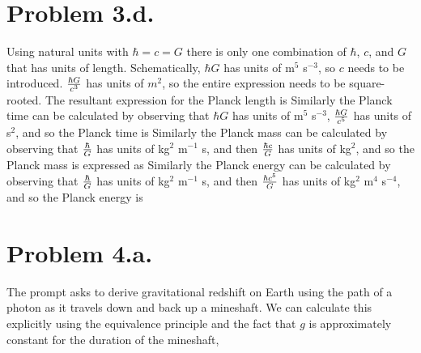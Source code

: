 \documentclass{article}
\begin{document}
\section*{Problem 3.d.}
Using natural units with $\hbar=c=G$ there is only one combination of $\hbar$, $c$, and $G$ that has units of length. Schematically,
$\hbar G$ has units of m$^5$ s$^{-3}$, so $c$ needs to be introduced. $\frac{\hbar G}{c^3}$ has units of $m^2$, so the entire expression needs to be square-rooted. The resultant expression for the Planck length is
Similarly the Planck time can be calculated by observing that $\hbar G$ has units of m$^5$ s$^{-3}$, $\frac{\hbar G}{c^5}$ has units of s$^2$, and so the Planck time is
Similarly the Planck mass can be calculated by observing that $\frac{\hbar}{G}$ has units of kg$^2$ m$^{-1}$ s, and then $\frac{\hbar c}{G}$ has units of kg$^2$, and so the Planck mass is expressed as
Similarly the Planck energy can be calculated by observing that $\frac{\hbar}{G}$ has units of kg$^2$ m$^{-1}$ s, and then $\frac{\hbar c^5}{G}$ has units of kg$^2$ m$^4$ s$^{-4}$, and so the Planck energy is
\section*{Problem 4.a.}
The prompt asks to derive gravitational redshift on Earth using the path of a photon as it travels down and back up a mineshaft. We can calculate this explicitly using the equivalence principle and the fact that $g$ is approximately constant for the duration of the mineshaft,
\end{document}
